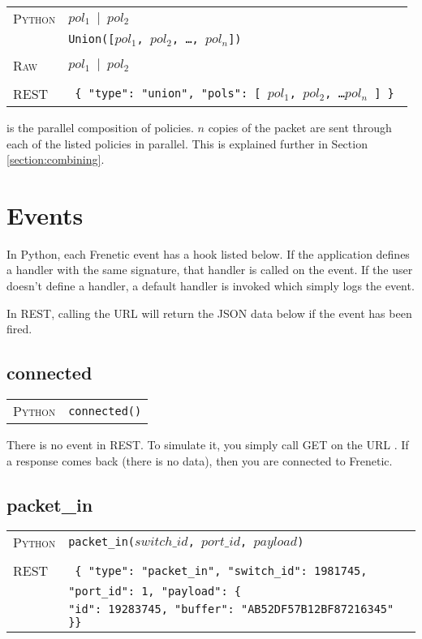 \bigskip
\begin{tabularx}{\linewidth}{lX}
\textsc{Python}   & \texttt{$pol_1$ $\vert$ $pol_2$} \\
    & \texttt{Union([$pol_1$, $pol_2$, \ldots, $pol_n$])} \\ \\
\textsc{Raw}    & \texttt{$pol_1$ $\vert$  $pol_2$}  \\ \\
\textsc{REST} & \texttt{ \{ "type": "union", "pols": [ $pol_1$, $pol_2$, \ldots $pol_n$ ] \} } 
\end{tabularx}

 is the parallel composition of policies.  $n$ copies of the packet are sent through
each of the listed policies in parallel.  This is explained further in Section \ref{section:combining}.

\section{Events}
\label{netkat_reference:events}

In Python, each Frenetic event has a hook listed below.  If the application defines a handler with the same
signature, that handler is called on the event.  If the user doesn't define a handler, a default handler is
invoked which simply logs the event.  

In REST, calling the URL  will
return the JSON data below if the event has been fired. 

\subsection{connected}

\bigskip
\begin{tabularx}{\linewidth}{lX}
\textsc{Python}   & \texttt{connected()} \\
\end{tabularx}

There is no  event in REST.  To simulate it, you simply call GET on the URL .  If 
a response comes back (there is no data), then you are connected to Frenetic.

\subsection{packet\_in}

\bigskip
\begin{tabularx}{\linewidth}{lX}
\textsc{Python}   & \texttt{packet\_in($switch\_id$, $port\_id$, $payload$)} \\ \\
\textsc{REST} & \texttt{ \{ "type": "packet\_in", "switch\_id": 1981745, } \\
  & \texttt{"port\_id": 1, "payload": \{ } \\
  & \texttt{"id": 19283745, "buffer": "AB52DF57B12BF87216345" \}\} }
\end{tabularx}

